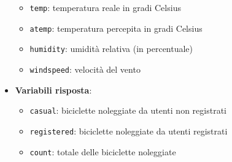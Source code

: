 \begin{itemize}
\begin{itemize}
  \item \texttt{temp}: temperatura reale in gradi Celsius

  \item \texttt{atemp}: temperatura percepita in gradi Celsius

  \item \texttt{humidity}: umidità relativa (in percentuale)

  \item \texttt{windspeed}: velocità del vento

  \end{itemize}
\item \textbf{Variabili risposta}:
    \begin{itemize}

  \item \texttt{casual}:  biciclette noleggiate da utenti non registrati

  \item \texttt{registered}: biciclette noleggiate da utenti registrati

  \item \texttt{count}: totale delle biciclette noleggiate

    \end{itemize}
\end{itemize}
